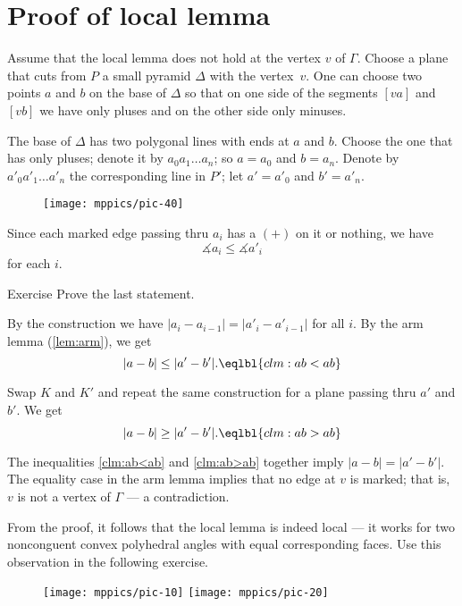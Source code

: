 \section{Proof of local lemma}
 
Assume that the local lemma does not hold at the vertex $v$ of $\Gamma$.
Choose a plane that cuts from $P$ a small pyramid $\Delta$ with the vertex~$v$.
One can choose two points $a$ and $b$ on the base of $\Delta$
so that on one side of the segments $[va]$ and $[vb]$ we have only pluses
and on the other side only minuses.

The base of $\Delta$ has two polygonal lines with ends at $a$ and $b$.
Choose the one that has only pluses;
denote it by $a_0 a_1 \dots a_n$;
so $a=a_0$ and $b=a_n$.
Denote by $a'_0 a'_1 \dots a'_n$
the corresponding line in $P'$;
let $a'=a'_0$ and $b'=a'_n$.

{

\begin{wrapfigure}{r}{40mm}
\vskip-0mm
\centering
\texttt{[image: mppics/pic-40]}
\vskip-0mm
\end{wrapfigure}

Since each marked edge passing thru $a_i$ has a $(+)$ on it or nothing, 
we have 
$$\measuredangle a_i\le\measuredangle a'_i$$
for each $i$.

}

\begin{thm}{Exercise}\label{ex:a<a}
Prove the last statement. 
\end{thm}

By the construction we have $|a_i-a_{i-1}|=|a'_i-a'_{i-1}|$ for all $i$.
By the arm lemma (\ref{lem:arm}), 
we get 
\[|a-b|\le |a'-b'|.
\eqlbl{clm:ab<ab}\]

Swap $K$ and $K'$ and repeat the same construction for a plane passing thru $a'$ and $b'$.
We get
\[|a-b|\ge |a'-b'|.
\eqlbl{clm:ab>ab}\]

The inequalities
\ref{clm:ab<ab} and \ref{clm:ab>ab} 
together imply $|a-b|=|a'-b'|$.
The equality case in the arm lemma implies that no edge at $v$ is marked;
that is, $v$ is not a vertex of $\Gamma$
--- a contradiction.
\qeds

From the proof, it follows that the local lemma is indeed local --- it works for two nonconguent convex polyhedral angles with equal corresponding faces.
Use this observation in the following exercise.

\begin{wrapfigure}{r}{20mm}
\vskip-0mm
\centering
\texttt{[image: mppics/pic-10]}
\bigskip
\texttt{[image: mppics/pic-20]}
\vskip-0mm
\end{wrapfigure}

